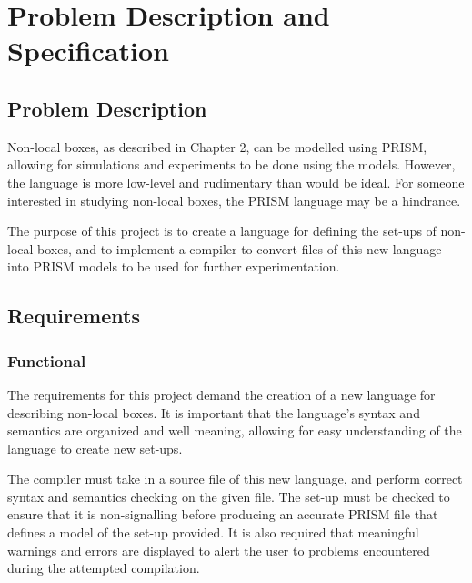 \documentclass[report.tex]{subfiles}
\begin{document}
\chapter{Problem Description and Specification} %
\label{cha:problem_description_and_specification}


\section{Problem Description} %
\label{sec:problem_description}
Non-local boxes, as described in Chapter 2, can be modelled using PRISM, 
allowing for simulations and experiments to be done using the models. However,
the language is more low-level and rudimentary than would be ideal. For someone
interested in studying non-local boxes, the PRISM language may be a hindrance.

The purpose of this project is to create a language for defining the set-ups of
non-local boxes, and to implement a compiler to convert files of this new
language into PRISM models to be used for further experimentation.


\section{Requirements} %
\label{sec:requirements}

\subsection{Functional} %
\label{sub:functional}
The requirements for this project demand the creation of a new language for
describing non-local boxes. It is important that the language's syntax and
semantics are organized and well meaning, allowing for easy understanding of the
language to create new set-ups.

The compiler must take in a source file of this new language, and perform
correct syntax and semantics checking on the given file. The set-up must be
checked to ensure that it is non-signalling before producing an accurate PRISM
file that defines a model of the set-up provided. It is also required that
meaningful warnings and errors are displayed to alert the user to problems
encountered during the attempted compilation.
\end{document}
